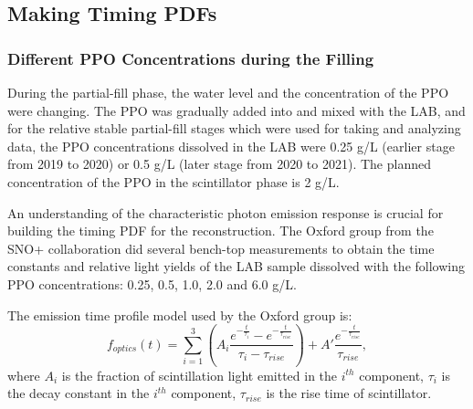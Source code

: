 \subsection{Making Timing PDFs}

\subsubsection{Different PPO Concentrations during the Filling}\label{sect:differentPPOconcen}
During the partial-fill phase, the water level and the concentration of the PPO were changing. The PPO was gradually added into and mixed with the LAB, and for the relative stable partial-fill stages which were used for taking and analyzing data, the PPO concentrations dissolved in the LAB were 0.25 g/L (earlier stage from 2019 to 2020) or 0.5 g/L (later stage from 2020 to 2021). The planned concentration of the PPO in the scintillator phase is 2 g/L.

An understanding of the characteristic photon emission response is crucial for building the timing PDF for the reconstruction. The Oxford group from the SNO+ collaboration did several bench-top measurements to obtain the time constants and relative light yields of the LAB sample dissolved with the following PPO concentrations: 0.25, 0.5, 1.0, 2.0 and 6.0 g/L\cite{oxfordMeasurement0,oxfordMeasurement}.

The emission time profile model used by the Oxford group is\cite{oxfordMeasurement}: 
\begin{equation}
f_{optics}(t)=\sum_{i=1}^3 (A_i\frac{e^{-\frac{t}{\tau_i}}-e^{-\frac{t}{\tau_{rise}}}}{\tau_i-\tau_{rise}})+A'\frac{e^{-\frac{t}{\tau_{rise}}}}{\tau_{rise}},
\end{equation}
where $A_i$ is the fraction of scintillation light emitted in the $i^{th}$ component, $\tau_i$ is the decay constant in the $i^{th}$ component, $\tau_{rise}$ is the rise time of scintillator.

